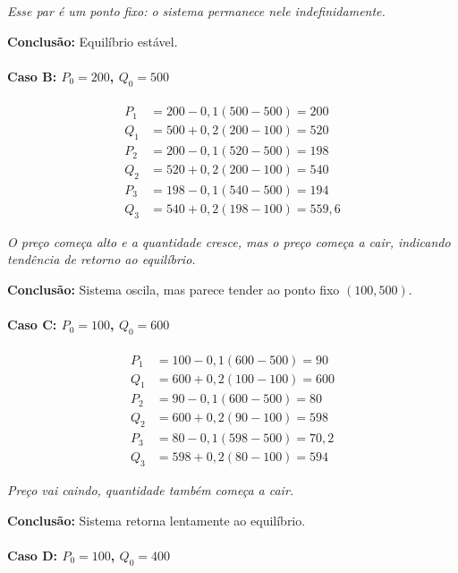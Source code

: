 \documentclass{article}
\begin{document}
\textit{Esse par é um ponto fixo: o sistema permanece nele indefinidamente.}

\textbf{Conclusão:} Equilíbrio estável.

\paragraph{Caso B: $P_0 = 200$, $Q_0 = 500$}

\[
\begin{aligned}
P_1 &= 200 - 0{,}1(500 - 500) = 200 \\
Q_1 &= 500 + 0{,}2(200 - 100) = 520 \\
P_2 &= 200 - 0{,}1(520 - 500) = 198 \\
Q_2 &= 520 + 0{,}2(200 - 100) = 540 \\
P_3 &= 198 - 0{,}1(540 - 500) = 194 \\
Q_3 &= 540 + 0{,}2(198 - 100) = 559{,}6
\end{aligned}
\]

\textit{O preço começa alto e a quantidade cresce, mas o preço começa a cair, indicando tendência de retorno ao equilíbrio.}

\textbf{Conclusão:} Sistema oscila, mas parece tender ao ponto fixo $(100, 500)$.

\paragraph{Caso C: $P_0 = 100$, $Q_0 = 600$}

\[
\begin{aligned}
P_1 &= 100 - 0{,}1(600 - 500) = 90 \\
Q_1 &= 600 + 0{,}2(100 - 100) = 600 \\
P_2 &= 90 - 0{,}1(600 - 500) = 80 \\
Q_2 &= 600 + 0{,}2(90 - 100) = 598 \\
P_3 &= 80 - 0{,}1(598 - 500) = 70{,}2 \\
Q_3 &= 598 + 0{,}2(80 - 100) = 594
\end{aligned}
\]

\textit{Preço vai caindo, quantidade também começa a cair.}

\textbf{Conclusão:} Sistema retorna lentamente ao equilíbrio.

\paragraph{Caso D: $P_0 = 100$, $Q_0 = 400$}
\end{document}
